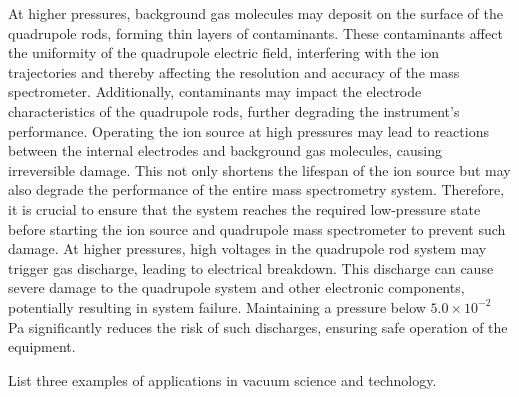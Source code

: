 At higher pressures, background gas molecules may deposit on the surface of the quadrupole rods, forming thin layers of contaminants. These contaminants affect the uniformity of the quadrupole electric field, interfering with the ion trajectories and thereby affecting the resolution and accuracy of the mass spectrometer. Additionally, contaminants may impact the electrode characteristics of the quadrupole rods, further degrading the instrument's performance. Operating the ion source at high pressures may lead to reactions between the internal electrodes and background gas molecules, causing irreversible damage. This not only shortens the lifespan of the ion source but may also degrade the performance of the entire mass spectrometry system. Therefore, it is crucial to ensure that the system reaches the required low-pressure state before starting the ion source and quadrupole mass spectrometer to prevent such damage. At higher pressures, high voltages in the quadrupole rod system may trigger gas discharge, leading to electrical breakdown. This discharge can cause severe damage to the quadrupole system and other electronic components, potentially resulting in system failure. Maintaining a pressure below \(5.0 \times 10^{-2}\) Pa significantly reduces the risk of such discharges, ensuring safe operation of the equipment.

\begin{question}
	List three examples of applications in vacuum science and technology.
\end{question}

